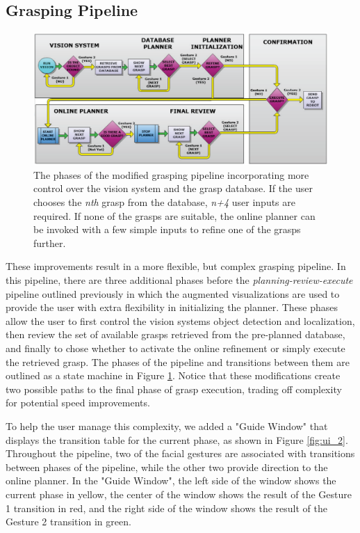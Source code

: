 \subsection{Grasping Pipeline}
\begin{figure}[th!]
	\centering
	\includegraphics[width=1\columnwidth]{pipeline_2.png}
	\caption{The phases of the modified grasping pipeline incorporating more control over the vision system and the grasp database. If the user chooses the \emph{nth} grasp from the database, \emph{n+4} user inputs are required. If none of the grasps are suitable, the online planner can be invoked with a few simple inputs to refine one of the grasps further.}
	\label{fig:pipeline_2}
\end{figure}
\label{sec:pipline_2}
These improvements result in a more flexible, but complex grasping pipeline. In this pipeline, there are three additional phases before the  \emph{planning-review-execute} pipeline outlined previously in which the augmented visualizations are used to provide the user with extra flexibility in initializing the planner. These phases allow the user to first control the vision systems object detection and localization, then review the set of available grasps retrieved from the pre-planned database, and finally to chose whether to activate the online refinement or simply execute the retrieved grasp. The phases of the pipeline and transitions between them are outlined as a state machine in Figure \ref{fig:pipeline_2}. Notice that these modifications create two possible paths to the final phase of grasp execution, trading off complexity for potential speed improvements. 

To help the user manage this complexity, we added a "Guide Window" that displays the transition table for the current phase, as shown in Figure \ref{fig:ui_2}. Throughout the pipeline, two of the facial gestures are associated with transitions between phases of the pipeline, while the other two provide direction to the online planner. In the "Guide Window", the left side of the window shows the current phase in yellow, the center of the window shows the result of the Gesture 1 transition in red, and the right side of the window shows the result of the Gesture 2 transition in green. 

